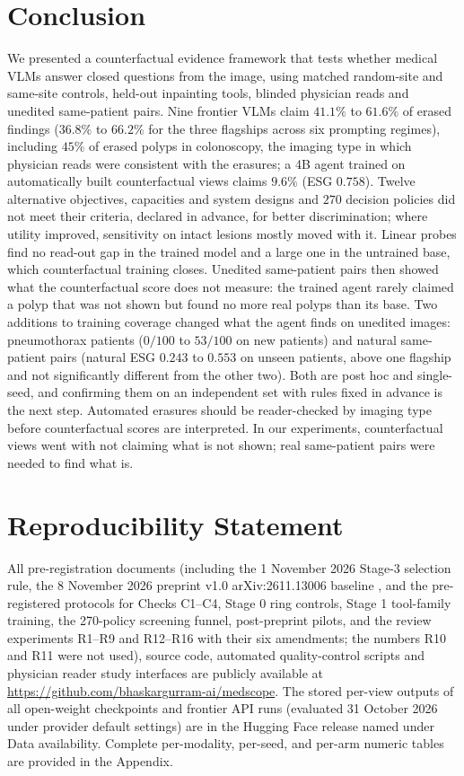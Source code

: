 \documentclass[5p,times,twocolumn,authoryear]{elsarticle}
\begin{document}
\section{Conclusion}
\label{sec:conclusion}
We presented a counterfactual evidence framework that tests whether medical VLMs answer closed questions from the image, using matched random-site and same-site controls, held-out inpainting tools, blinded physician reads and unedited same-patient pairs. Nine frontier VLMs claim $41.1\%$ to $61.6\%$ of erased findings ($36.8\%$ to $66.2\%$ for the three flagships across six prompting regimes), including $45\%$ of erased polyps in colonoscopy, the imaging type in which physician reads were consistent with the erasures; a 4B agent trained on automatically built counterfactual views claims $9.6\%$ (ESG $0.758$). Twelve alternative objectives, capacities and system designs and $270$ decision policies did not meet their criteria, declared in advance, for better discrimination; where utility improved, sensitivity on intact lesions mostly moved with it. Linear probes find no read-out gap in the trained model and a large one in the untrained base, which counterfactual training closes. Unedited same-patient pairs then showed what the counterfactual score does not measure: the trained agent rarely claimed a polyp that was not shown but found no more real polyps than its base. Two additions to training coverage changed what the agent finds on unedited images: pneumothorax patients ($0/100$ to $53/100$ on new patients) and natural same-patient pairs (natural ESG $0.243$ to $0.553$ on unseen patients, above one flagship and not significantly different from the other two). Both are post hoc and single-seed, and confirming them on an independent set with rules fixed in advance is the next step. Automated erasures should be reader-checked by imaging type before counterfactual scores are interpreted. In our experiments, counterfactual views went with not claiming what is not shown; real same-patient pairs were needed to find what is.

\section*{Reproducibility Statement}
All pre-registration documents (including the 1 November 2026 Stage-3 selection rule, the 8 November 2026 preprint v1.0 arXiv:2611.13006 baseline \citep{gurram2026medscope}, and the pre-registered protocols for Checks C1--C4, Stage 0 ring controls, Stage 1 tool-family training, the 270-policy screening funnel, post-preprint pilots, and the review experiments R1--R9 and R12--R16 with their six amendments; the numbers R10 and R11 were not used), source code, automated quality-control scripts and physician reader study interfaces are publicly available at \url{https://github.com/bhaskargurram-ai/medscope}. The stored per-view outputs of all open-weight checkpoints and frontier API runs (evaluated 31 October 2026 under provider default settings) are in the Hugging Face release named under Data availability. Complete per-modality, per-seed, and per-arm numeric tables are provided in the Appendix.
\end{document}
